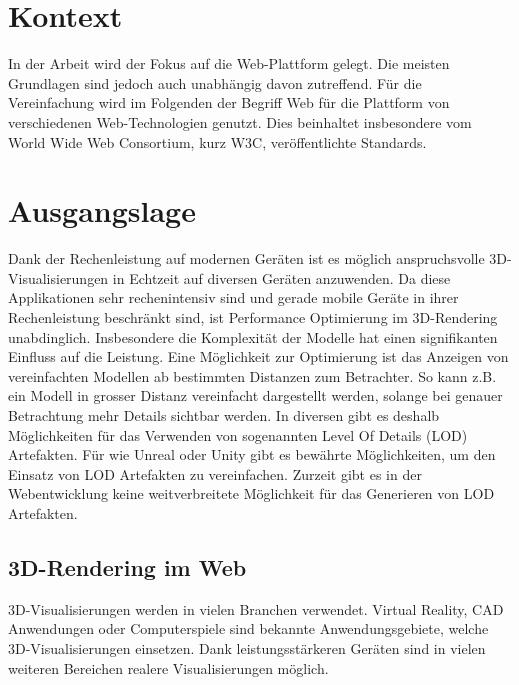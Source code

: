 
\section{Kontext}
In der Arbeit wird der Fokus auf die Web-Plattform gelegt. Die meisten Grundlagen sind jedoch auch unabhängig davon zutreffend.
Für die Vereinfachung wird im Folgenden der Begriff Web für die Plattform von verschiedenen Web-Technologien genutzt. Dies beinhaltet insbesondere vom World Wide Web Consortium, kurz W3C, veröffentlichte Standards.

\section{Ausgangslage}
Dank der Rechenleistung auf modernen Geräten ist es möglich anspruchsvolle 3D-Visualisierungen in Echtzeit auf diversen Geräten anzuwenden. Da diese Applikationen sehr rechenintensiv sind und gerade mobile Geräte in ihrer Rechenleistung beschränkt sind, ist Performance Optimierung im 3D-Rendering unabdinglich. Insbesondere die Komplexität der Modelle hat einen signifikanten Einfluss auf die Leistung.
Eine Möglichkeit zur Optimierung ist das Anzeigen von vereinfachten Modellen ab bestimmten Distanzen zum Betrachter. So kann z.B. ein Modell in grosser Distanz vereinfacht dargestellt werden, solange bei genauer Betrachtung mehr Details sichtbar werden.
In diversen  gibt es deshalb Möglichkeiten für das Verwenden von sogenannten Level Of Details (LOD) Artefakten.
Für  wie Unreal oder Unity gibt es bewährte Möglichkeiten, um den Einsatz von LOD Artefakten zu vereinfachen. Zurzeit gibt es in der Webentwicklung keine weitverbreitete Möglichkeit für das Generieren von LOD Artefakten.

\subsection{3D-Rendering im Web}
3D-Visualisierungen werden in vielen Branchen verwendet.
Virtual Reality, CAD Anwendungen oder Computerspiele sind bekannte Anwendungsgebiete, welche 3D-Visualisierungen einsetzen.
Dank leistungsstärkeren Geräten sind in vielen weiteren Bereichen realere Visualisierungen möglich.

